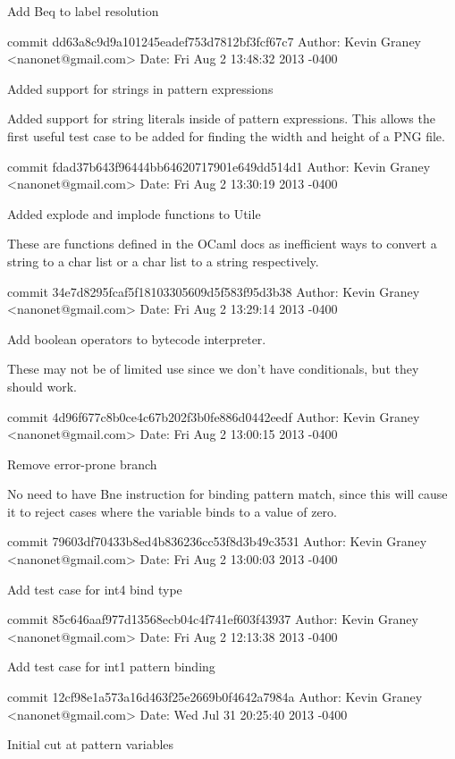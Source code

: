     Add Beq to label resolution

commit dd63a8c9d9a101245eadef753d7812bf3fcf67c7
Author: Kevin Graney <nanonet@gmail.com>
Date:   Fri Aug 2 13:48:32 2013 -0400

    Added support for strings in pattern expressions
    
    Added support for string literals inside of pattern expressions.
    This allows the first useful test case to be added for finding
    the width and height of a PNG file.

commit fdad37b643f96444bb64620717901e649dd514d1
Author: Kevin Graney <nanonet@gmail.com>
Date:   Fri Aug 2 13:30:19 2013 -0400

    Added explode and implode functions to Utile
    
    These are functions defined in the OCaml docs as inefficient ways
    to convert a string to a char list or a char list to a string
    respectively.

commit 34e7d8295fcaf5f18103305609d5f583f95d3b38
Author: Kevin Graney <nanonet@gmail.com>
Date:   Fri Aug 2 13:29:14 2013 -0400

    Add boolean operators to bytecode interpreter.
    
    These may not be of limited use since we don't have conditionals,
    but they should work.

commit 4d96f677c8b0ce4c67b202f3b0fe886d0442eedf
Author: Kevin Graney <nanonet@gmail.com>
Date:   Fri Aug 2 13:00:15 2013 -0400

    Remove error-prone branch
    
    No need to have Bne instruction for binding pattern match, since
    this will cause it to reject cases where the variable binds
    to a value of zero.

commit 79603df70433b8ed4b836236cc53f8d3b49c3531
Author: Kevin Graney <nanonet@gmail.com>
Date:   Fri Aug 2 13:00:03 2013 -0400

    Add test case for int4 bind type

commit 85c646aaf977d13568ecb04c4f741ef603f43937
Author: Kevin Graney <nanonet@gmail.com>
Date:   Fri Aug 2 12:13:38 2013 -0400

    Add test case for int1 pattern binding

commit 12cf98e1a573a16d463f25e2669b0f4642a7984a
Author: Kevin Graney <nanonet@gmail.com>
Date:   Wed Jul 31 20:25:40 2013 -0400

    Initial cut at pattern variables
    
